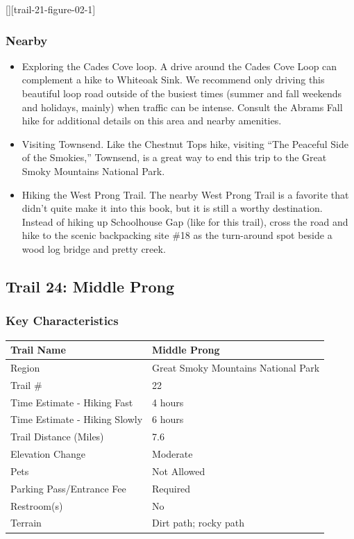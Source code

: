 \documentclass[
  letterpaper,
  DIV=11,
  numbers=noendperiod]{scrartcl}
\providecommand{\tightlist}{%
  \setlength{\itemsep}{0pt}\setlength{\parskip}{0pt}}\usepackage{longtable,booktabs,array}
\begin{document}
{[}{]}{[}trail-21-figure-02-1{]}

\hypertarget{nearby-22}{%
\subsubsection{Nearby}\label{nearby-22}}

\begin{itemize}
\tightlist
\item
  Exploring the Cades Cove loop. A drive around the Cades Cove Loop can
  complement a hike to Whiteoak Sink. We recommend only driving this
  beautiful loop road outside of the busiest times (summer and fall
  weekends and holidays, mainly) when traffic can be intense. Consult
  the Abrams Fall hike for additional details on this area and nearby
  amenities.
\item
  Visiting Townsend. Like the Chestnut Tops hike, visiting ``The
  Peaceful Side of the Smokies,'' Townsend, is a great way to end this
  trip to the Great Smoky Mountains National Park.
\item
  Hiking the West Prong Trail. The nearby West Prong Trail is a favorite
  that didn't quite make it into this book, but it is still a worthy
  destination. Instead of hiking up Schoolhouse Gap (like for this
  trail), cross the road and hike to the scenic backpacking site \#18 as
  the turn-around spot beside a wood log bridge and pretty creek.
\end{itemize}

\hypertarget{trail-24-middle-prong}{%
\subsection{Trail 24: Middle Prong}\label{trail-24-middle-prong}}

\hypertarget{key-characteristics-23}{%
\subsubsection{Key Characteristics}\label{key-characteristics-23}}

\begin{longtable}[]{@{}ll@{}}
\toprule\noalign{}
Trail Name & Middle Prong \\
\midrule\noalign{}
\endhead
\bottomrule\noalign{}
\endlastfoot
Region & Great Smoky Mountains National Park \\
Trail \# & 22 \\
Time Estimate - Hiking Fast & 4 hours \\
Time Estimate - Hiking Slowly & 6 hours \\
Trail Distance (Miles) & 7.6 \\
Elevation Change & Moderate \\
Pets & Not Allowed \\
Parking Pass/Entrance Fee & Required \\
Restroom(s) & No \\
Terrain & Dirt path; rocky path \\
\end{longtable}
\end{document}
